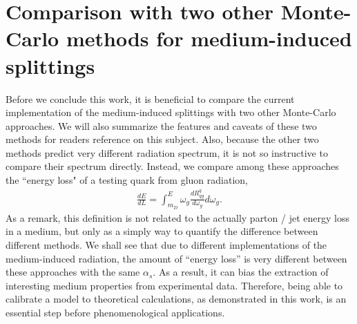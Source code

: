 \documentclass[aps, prc, reprint, amsmath, groupedaddress, nofootinbib]{revtex4-1}
\begin{document}
\section{Comparison with two other Monte-Carlo methods for medium-induced splittings}\label{section:compare}
Before we conclude this work, it is beneficial to compare the current implementation of the medium-induced splittings with two other Monte-Carlo approaches.
We will also summarize the features and caveats of these two methods for readers reference on this subject. 
Also, because the other two methods predict very different radiation spectrum, it is not so instructive to compare their spectrum directly.
Instead, we compare among these approaches the ``energy loss" of a testing quark from gluon radiation,
\begin{eqnarray}
\frac{dE}{dL} = \int_{m_D}^E \omega_g \frac{dR^q_{qg}}{d\omega_g} d\omega_g.
\label{eq:eloss}
\end{eqnarray}
As a remark, this definition is not related to the actually parton / jet energy loss in a medium, but only as a simply way to quantify the difference between different methods.
We shall see that due to different implementations of the medium-induced radiation, the amount of ``energy loss'' is very different between these approaches with the same $\alpha_s$.
As a result,  it can bias the extraction of interesting medium properties from experimental data.
Therefore, being able to calibrate a model to theoretical calculations, as demonstrated in this work, is an essential step before phenomenological applications.
\end{document}
